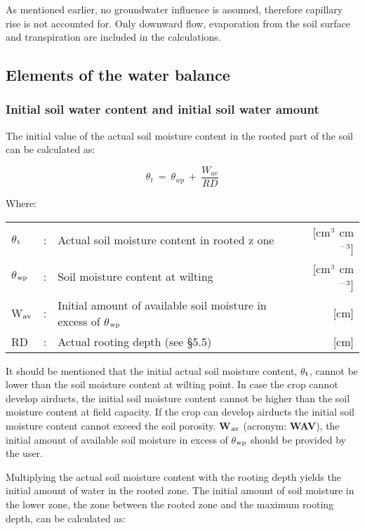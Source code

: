 As mentioned earlier, no groundwater influence is assumed, therefore capillary rise is not
accounted for. Only downward flow, evaporation from the soil surface and transpiration
are included in the calculations. 

\subsection{Elements of the water balance  }


\subsubsection{Initial soil water content and initial soil water amount}

The initial value of the actual soil moisture content in the rooted part of the soil can be
calculated as:

\begin{equation}
\theta_{t} ~ =~\theta_{wp} ~+~{\frac{W_{av}}{RD}}
\end{equation}

Where:\\[5pt]
\begin{tabularx}{\textwidth}{llXr}
$\theta$$_{{\rm t}}$ &:& Actual soil moisture content in rooted z
    one  & [cm$^{{\rm 3}}$ cm$^{{\rm -3}}$]\\
$\theta$$_{{\rm wp}}$ &:& Soil moisture content at wilting   & [cm$^{{\rm 3}}$ cm$^{{\rm -3}}$]\\
W$_{{\rm av}}$ &:& Initial amount of available soil moisture 
    in excess of $\theta$$_{{\rm wp}}$ & [cm]\\
RD &:& Actual rooting depth (see \S 5.5) & [cm]\\
\end{tabularx}

It should be mentioned that the initial actual soil moisture content, $\theta$$_{{\rm t}}$, cannot be lower
than the soil moisture content at wilting point. In case the crop cannot develop airducts,
the initial soil moisture content cannot be higher than the soil moisture content at field
capacity. If the crop can develop airducts the initial soil moisture content cannot exceed
the soil porosity. {\bf W$_{{\rm av}}$} (acronym: {\bf WAV}), the initial amount of available 
soil moisture in excess of $\theta$$_{{\rm wp}}$ should be provided by the user. 

Multiplying the actual soil moisture content with the rooting depth yields the initial
amount of water in the rooted zone. The initial amount of soil moisture in the lower zone,
the zone between the rooted zone and the maximum rooting depth, can be calculated as:

